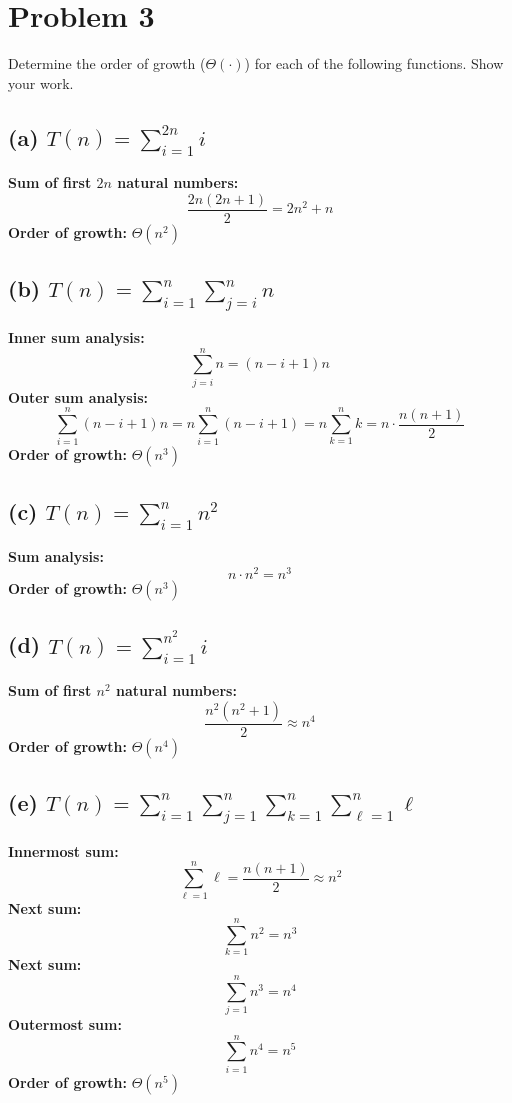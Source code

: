 \section*{Problem 3}
Determine the order of growth (\(\Theta(\cdot)\)) for each of the following functions. Show your work.

\subsection*{(a) \( T(n) = \sum_{i=1}^{2n} i \)}
\textbf{Sum of first \(2n\) natural numbers:}
\[
\frac{2n(2n+1)}{2} = 2n^2 + n
\]
\textbf{Order of growth:} \( \Theta(n^2) \)

\subsection*{(b) \( T(n) = \sum_{i=1}^{n} \sum_{j=i}^{n} n \)}
\textbf{Inner sum analysis:}
\[
\sum_{j=i}^{n} n = (n-i+1)n
\]
\textbf{Outer sum analysis:}
\[
\sum_{i=1}^{n} (n-i+1)n = n \sum_{i=1}^{n} (n-i+1) = n \sum_{k=1}^{n} k = n \cdot \frac{n(n+1)}{2}
\]
\textbf{Order of growth:} \( \Theta(n^3) \)

\subsection*{(c) \( T(n) = \sum_{i=1}^{n} n^2 \)}
\textbf{Sum analysis:}
\[
n \cdot n^2 = n^3
\]
\textbf{Order of growth:} \( \Theta(n^3) \)

\subsection*{(d) \( T(n) = \sum_{i=1}^{n^2} i \)}
\textbf{Sum of first \(n^2\) natural numbers:}
\[
\frac{n^2(n^2 + 1)}{2} \approx n^4
\]
\textbf{Order of growth:} \( \Theta(n^4) \)

\subsection*{(e) \( T(n) = \sum_{i=1}^{n} \sum_{j=1}^{n} \sum_{k=1}^{n} \sum_{\ell=1}^{n} \ell \)}
\textbf{Innermost sum:}
\[
\sum_{\ell=1}^{n} \ell = \frac{n(n+1)}{2} \approx n^2
\]
\textbf{Next sum:}
\[
\sum_{k=1}^{n} n^2 = n^3
\]
\textbf{Next sum:}
\[
\sum_{j=1}^{n} n^3 = n^4
\]
\textbf{Outermost sum:}
\[
\sum_{i=1}^{n} n^4 = n^5
\]
\textbf{Order of growth:} \( \Theta(n^5) \)


